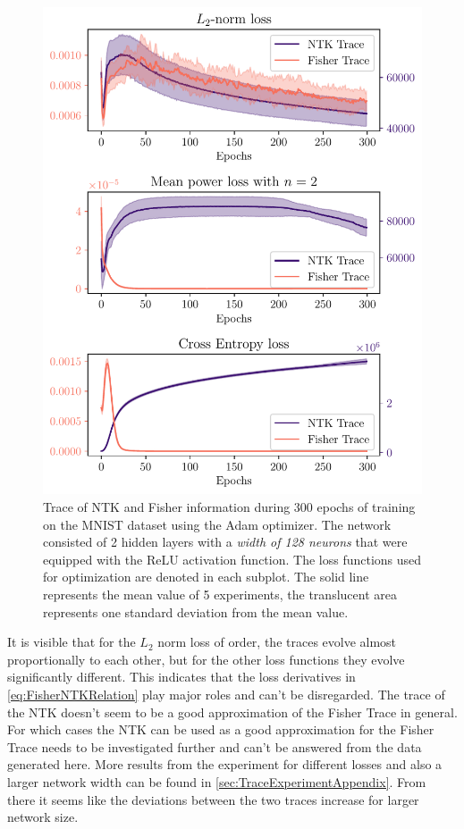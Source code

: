 \begin{figure}
	\centering
	\includegraphics{text/results/FisherNTKComparisonPlots/Triple_comparison_losses2_128.pdf}
	\caption{Trace of NTK and Fisher information during 300 epochs of training on the MNIST dataset using the Adam optimizer. The network consisted of 2 hidden layers with a \emph{width of 128 neurons} that were equipped with the ReLU activation function. The loss functions used for optimization are denoted in each subplot. The solid line represents the mean value of 5 experiments, the translucent area represents one standard deviation from the mean value.}
	\label{fig:MNISTTraceComparison}
\end{figure}
It is visible that for the $L_2$ norm loss of order, the traces evolve almost proportionally to each other, but for the other loss functions they evolve significantly different. This indicates that the loss derivatives in \cref{eq:FisherNTKRelation} play major roles and can't be disregarded. The trace of the NTK doesn't seem to be a good approximation of the Fisher Trace in general. For which cases the NTK can be used as a good approximation for the Fisher Trace needs to be investigated further and can't be answered from the data generated here. More results from the experiment for different losses and also a larger network width can be found in \cref{sec:TraceExperimentAppendix}. From there it seems like the deviations between the two traces increase for larger network size. 